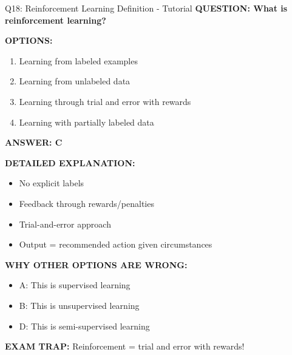 \documentclass[8pt]{beamer}
\begin{document}
	\begin{frame}{Q18: Reinforcement Learning Definition - Tutorial}
		\fontsize{6.5}{7.5}\selectfont
		\textbf{QUESTION: What is reinforcement learning?}
		
		\vspace{0.1cm}
		\textbf{OPTIONS:}
		\begin{enumerate}
			\item Learning from labeled examples
			\item Learning from unlabeled data
			\item Learning through trial and error with rewards
			\item Learning with partially labeled data
		\end{enumerate}
		
		\vspace{0.1cm}
		\textcolor{myblue}{\textbf{ANSWER: C}}
		
		\vspace{0.1cm}
		\textbf{DETAILED EXPLANATION:}
		\begin{itemize}
			\item No explicit labels
			\item Feedback through rewards/penalties
			\item Trial-and-error approach
			\item Output = recommended action given circumstances
		\end{itemize}
		
		\vspace{0.1cm}
		\textcolor{myred}{\textbf{WHY OTHER OPTIONS ARE WRONG:}}
		\begin{itemize}
			\item \textcolor{myred}{A:} This is supervised learning
			\item \textcolor{myred}{B:} This is unsupervised learning
			\item \textcolor{myred}{D:} This is semi-supervised learning
		\end{itemize}
		
		\textcolor{myred}{\textbf{EXAM TRAP:}} Reinforcement = \textcolor{myblue}{trial and error with rewards}!
	\end{frame}
	
\end{document}
